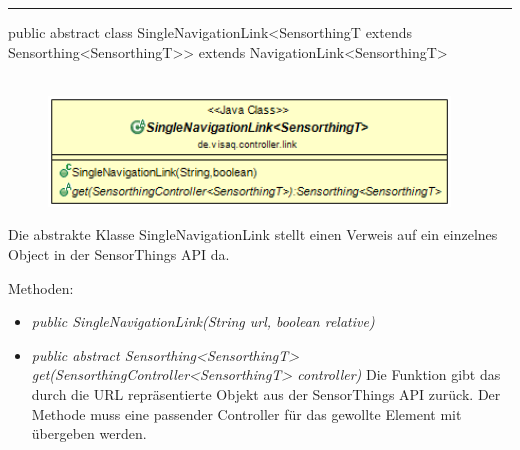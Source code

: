 \rule{\textwidth}{0.4pt}
public abstract class SingleNavigationLink<SensorthingT extends Sensorthing<SensorthingT>> extends NavigationLink<SensorthingT>
\\\\
\begin{minipage}{0.55\textwidth}
    \begin{figure}[H]
        {\centering\includegraphics[width=0.95\textwidth]{media/backend/controller/classes/SingleNavigationLink.png}}
    \end{figure}
    \end{minipage} \hfill
\begin{minipage}{0.45\textwidth}
    Die abstrakte Klasse SingleNavigationLink stellt einen Verweis auf ein einzelnes Object in der \gls{SensorThings API} da.
\end{minipage}

Methoden:
\begin{itemize}
    \item \emph{public SingleNavigationLink(String url, boolean relative)}
    \relativeDescription
    \item \emph{public abstract Sensorthing<SensorthingT> get(SensorthingController<SensorthingT> controller)}
    Die Funktion gibt das durch die URL repräsentierte Objekt aus der \gls{SensorThings API} zurück.
    Der Methode muss eine passender Controller für das gewollte Element mit übergeben werden.
\end{itemize}

